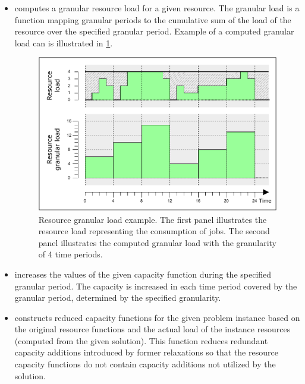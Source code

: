 \begin{itemize}
    \item {}
        computes a granular resource load for a given resource.
        The granular load is a function mapping granular periods to the cumulative sum of the load
        of the resource over the specified granular period.
        Example of a computed granular load can is illustrated in \cref{fig:granular-load}.

        \begin{figure}
            \centering
            \includegraphics[width=\textwidth]{img/GranularLoad.pdf}
            \caption{
                Resource granular load example.
                The first panel illustrates the resource load representing the consumption of jobs.
                The second panel illustrates the computed granular load with the granularity of 4 time periods.
                }
            \label{fig:granular-load}
        \end{figure}
        
    \item {}
        increases the values of the given capacity function during the specified granular period.
        The capacity is increased in each time period covered by the granular period,
        determined by the specified granularity.

    \item {}
        constructs reduced capacity functions for the given problem instance based on the original resource functions
        and the actual load of the instance resources (computed from the given solution).
        This function reduces redundant capacity additions introduced by former relaxations
        so that the resource capacity functions do not contain capacity additions not utilized by the solution.


\end{itemize}
